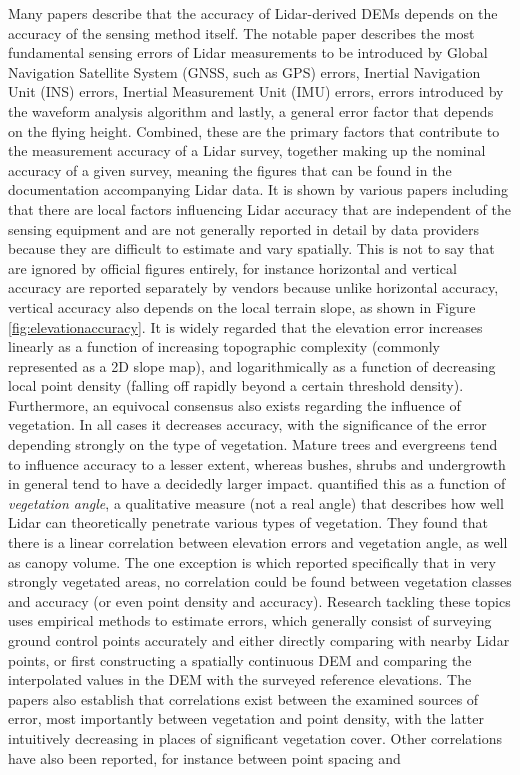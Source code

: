 Many papers describe that the accuracy of Lidar-derived DEMs depends on the accuracy of the sensing method itself. The notable paper \cite{hodgson_breshanan_2004} describes the most fundamental sensing errors of Lidar measurements to be introduced by Global Navigation Satellite System (GNSS, such as GPS) errors, Inertial Navigation Unit (INS) errors, Inertial Measurement Unit (IMU) errors, errors introduced by the waveform analysis algorithm and lastly, a general error factor that depends on the flying height. Combined, these are the primary factors that contribute to the measurement accuracy of a Lidar survey, together making up the nominal accuracy of a given survey, meaning the figures that can be found in the documentation accompanying Lidar data. It is shown by various papers including \cite{hodgson_breshanan_2004, su_bork_2006, kraus_etal_2006, raber_etal_2007, peng_shih_2006, chow_hodgson_2009, aguilar_etal_2005, aguilar_etal_2010, guo_etal_2010} that there are local factors influencing Lidar accuracy that are independent of the sensing equipment and are not generally reported in detail by data providers because they are difficult to estimate and vary spatially. This is not to say that are ignored by official figures entirely, for instance horizontal and vertical accuracy are reported separately by vendors because unlike horizontal accuracy, vertical accuracy also depends on the local terrain slope, as shown in Figure \ref{fig:elevationaccuracy}. It is widely regarded that the elevation error increases linearly as a function of increasing topographic complexity (commonly represented as a 2D slope map), and logarithmically as a function of decreasing local point density (falling off rapidly beyond a certain threshold density). Furthermore, an equivocal consensus also exists regarding the influence of vegetation. In all cases it decreases accuracy, with the significance of the error depending strongly on the type of vegetation. Mature trees and evergreens tend to influence accuracy to a lesser extent, whereas bushes, shrubs and undergrowth in general tend to have a decidedly larger impact. \cite{peng_shih_2006} quantified this as a function of \textit{vegetation angle}, a qualitative measure (not a real angle) that describes how well Lidar can theoretically penetrate various types of vegetation. They found that there is a linear correlation between elevation errors and vegetation angle, as well as canopy volume. The one exception is \cite{raber_etal_2007} which reported specifically that in very strongly vegetated areas, no correlation could be found between vegetation classes and accuracy (or even point density and accuracy). Research tackling these topics uses empirical methods to estimate errors, which generally consist of surveying ground control points accurately and either directly comparing with nearby Lidar points, or first constructing a spatially continuous DEM and comparing the interpolated values in the DEM with the surveyed reference elevations. The papers also establish that correlations exist between the examined sources of error, most importantly between vegetation and point density, with the latter intuitively decreasing in places of significant vegetation cover. Other correlations have also been reported, for instance between point spacing and 